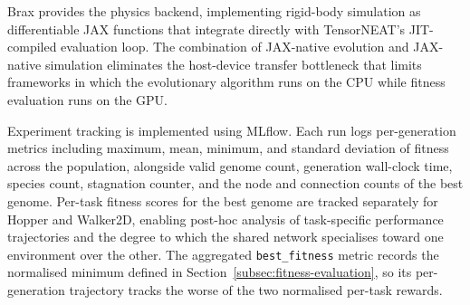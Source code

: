 \documentclass[12pt]{article}
\begin{document}
Brax \parencite{freeman_brax_2021} provides the physics backend, implementing rigid-body simulation as differentiable JAX functions that integrate directly with TensorNEAT's JIT-compiled evaluation loop.
The combination of JAX-native evolution and JAX-native simulation eliminates the host-device transfer bottleneck that limits frameworks in which the evolutionary algorithm runs on the CPU while fitness evaluation runs on the GPU.

Experiment tracking is implemented using MLflow.
Each run logs per-generation metrics including maximum, mean, minimum, and standard deviation of fitness across the population, alongside valid genome count, generation wall-clock time, species count, stagnation counter, and the node and connection counts of the best genome.
Per-task fitness scores for the best genome are tracked separately for Hopper and Walker2D, enabling post-hoc analysis of task-specific performance trajectories and the degree to which the shared network specialises toward one environment over the other.
The aggregated \texttt{best\_fitness} metric records the normalised minimum defined in Section~\ref{subsec:fitness-evaluation}, so its per-generation trajectory tracks the worse of the two normalised per-task rewards.
\end{document}
